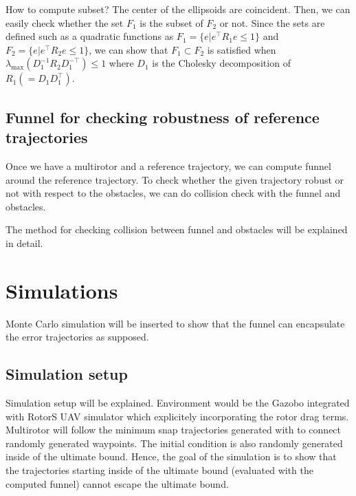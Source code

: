 \documentclass[letterpaper, 10 pt, conference]{ieeeconf}  %
\begin{document}
How to compute subset?
The center of the ellipsoids are coincident. Then, we can easily check whether the set $F_1$ is the subset of $F_2$ or not.
Since the sets are defined such as a quadratic functions as $F_1 = \{e|e^\top R_1 e \leq 1\}$ and $F_2 = \{e|e^\top R_2 e \leq 1\}$, we can show that $F_1 \subset F_2$ is satisfied when $\lambda_{\max}(D_1^{-1}R_2D_1^{-\top} )\leq 1$ where $D_1$ is the Cholesky decomposition of $R_1( = D_1D_1^\top)$.

\subsection{Funnel for checking robustness of reference trajectories}
Once we have a multirotor and a reference trajectory, we can compute funnel around the reference trajectory. 
To check whether the given trajectory robust or not with respect to the obstacles, we can do collision check with the funnel and obstacles.

The method for checking collision between funnel and obstacles will be explained in detail.


\section{Simulations}
Monte Carlo simulation will be inserted to show that the funnel can encapsulate the error trajectories as supposed. 
\subsection{Simulation setup}
Simulation setup will be explained. Environment would be the Gazobo integrated with RotorS UAV simulator which explicitely incorporating the rotor drag terms.
Multirotor will follow the minimum snap trajectories generated with to connect randomly generated waypoints.
The initial condition is also randomly generated inside of the ultimate bound. 
Hence, the goal of the simulation is to show that the trajectories starting inside of the ultimate bound (evaluated with the computed funnel) cannot escape the ultimate bound.
\end{document}
